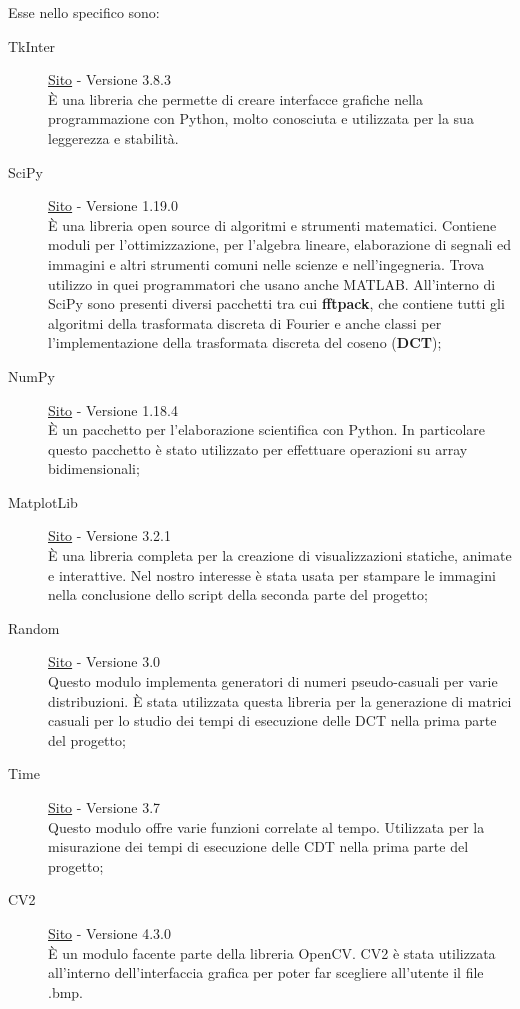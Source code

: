 \documentclass[preprint,12pt]{elsarticle}
\begin{document}
Esse nello specifico sono:
\begin{description}
\item[TkInter] \href{https://docs.python.org/3/library/tk.html}{Sito} - Versione 3.8.3 \\
\`E una libreria che permette di creare interfacce grafiche nella programmazione con Python, molto conosciuta e utilizzata per la sua leggerezza e stabilità.

\item[SciPy] \href{https://www.scipy.org}{Sito} - Versione 1.19.0 \\
\`E una libreria open source di algoritmi e strumenti matematici. Contiene moduli per l'ottimizzazione, per l'algebra lineare, elaborazione di segnali ed immagini  e altri strumenti comuni nelle scienze e nell'ingegneria. Trova utilizzo in quei programmatori che usano anche MATLAB. All'interno di SciPy sono presenti diversi pacchetti tra cui \textbf{fftpack}, che contiene tutti gli algoritmi della trasformata discreta di Fourier e anche classi per l'implementazione della trasformata discreta del coseno (\textbf{DCT});

\item[NumPy] \href{https://numpy.org}{Sito} - Versione 1.18.4 \\
\`E un pacchetto per l'elaborazione scientifica con Python. In particolare questo pacchetto è stato utilizzato per effettuare operazioni su array bidimensionali;

\item[MatplotLib] \href{https://matplotlib.org}{Sito} - Versione 3.2.1 \\
\`E una libreria completa per la creazione di visualizzazioni statiche, animate e interattive. Nel nostro interesse è stata usata per stampare le immagini nella conclusione dello script della seconda parte del progetto;

\item[Random] \href{https://docs.python.org/3.8/library/random.html}{Sito} - Versione 3.0 \\
Questo modulo implementa generatori di numeri pseudo-casuali per varie distribuzioni. \`E stata utilizzata questa libreria per la generazione di matrici casuali per lo studio dei tempi di esecuzione delle DCT nella prima parte del progetto;

\item[Time] \href{https://docs.python.org/3/library/time.html}{Sito} - Versione 3.7 \\
Questo modulo offre varie funzioni correlate al tempo. Utilizzata per la misurazione dei tempi di esecuzione delle CDT nella prima parte del progetto;

\item[CV2] \href{https://docs.opencv.org/master/index.html}{Sito} - Versione 4.3.0 \\
\`E un modulo facente parte della libreria OpenCV. CV2 è stata utilizzata all'interno dell'interfaccia grafica per poter far scegliere all'utente il file .bmp.
\end{description}
\end{document}
